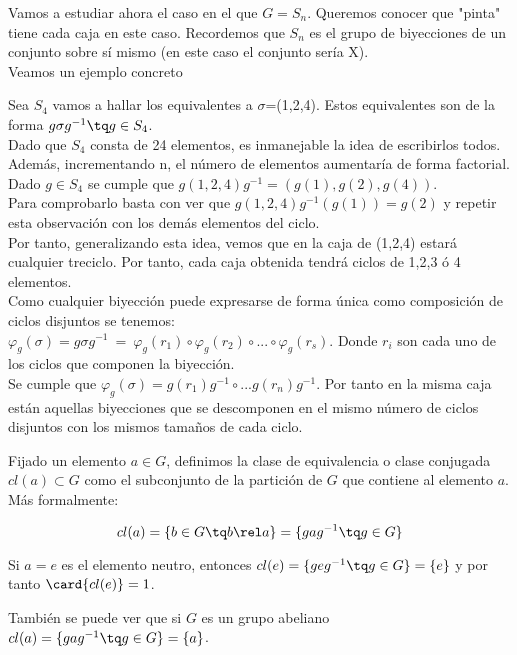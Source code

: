 \documentclass[nochap]{apuntes}
\begin{document}
Vamos a estudiar ahora el caso en el que $G=S_{n}$. Queremos conocer que "pinta" tiene cada caja en este caso. Recordemos que
$S_{n}$  es el grupo de biyecciones de un conjunto sobre sí mismo (en este caso el conjunto sería X).\\
Veamos un ejemplo concreto
\begin{example}
 Sea $S_{4}$  vamos a hallar los equivalentes a $\sigma$=(1,2,4). Estos equivalentes son de la forma $g\sigma g^{-1} \tq g \in S_{4}$.\\
 Dado que $S_{4}$  consta de 24 elementos, es inmanejable la idea de escribirlos todos. Además, incrementando n, el número de elementos
 aumentaría de forma factorial.\\
 Dado $g\in S_{4}$  se cumple que $g(1,2,4)g^{-1}=(g(1),g(2),g(4))$.\\
 Para comprobarlo basta con ver que $g(1,2,4)g^{-1}(g(1))=g(2)$  y repetir esta observación con los demás elementos del ciclo.\\
 Por tanto, generalizando esta idea, vemos que en la caja de (1,2,4) estará cualquier treciclo. Por tanto, cada caja obtenida tendrá
 ciclos de 1,2,3 ó 4 elementos.\\
 Como cualquier biyección puede expresarse de forma única como composición de ciclos disjuntos se tenemos:\\
 $\varphi_{g}(\sigma)=g\sigma g^{-1}\ = \ \varphi_{g}(r_{1}) \circ \varphi_{g}(r_{2}) \circ ... \circ \varphi_{g}(r_{s})$. Donde $r_{i}$  son cada uno de los
 ciclos que componen la biyección.\\
 Se cumple que $\varphi_{g}(\sigma)=g(r_{1})g^{-1} \circ ... g(r_{n})g^{-1}$.  Por tanto en la misma caja están aquellas biyecciones que se descomponen
 en el mismo número de ciclos disjuntos con los mismos tamaños de cada ciclo.
\end{example}

\begin{defn}
Fijado un elemento $a\in G$, definimos la clase de equivalencia o clase conjugada $cl(a) \subset G$ como el subconjunto de la partición de $G$ que contiene al elemento $a$. Más formalmente:

\[ cl(a) = \{ b \in G \tq b\rel a \} = \{ gag^{-1} \tq g \in G \} \]
\end{defn}

\begin{remark} Si $a = e$ es el elemento neutro, entonces $cl(e) = \{ geg^{-1} \tq g\in G\} = \{ e\} $ y por tanto $\card{cl(e)} = 1$.

También se puede ver que si $G$ es un grupo abeliano $cl(a) = \{ gag^{-1} \tq g \in G\} = \{ a \}$.
\end{remark}
\end{document}

